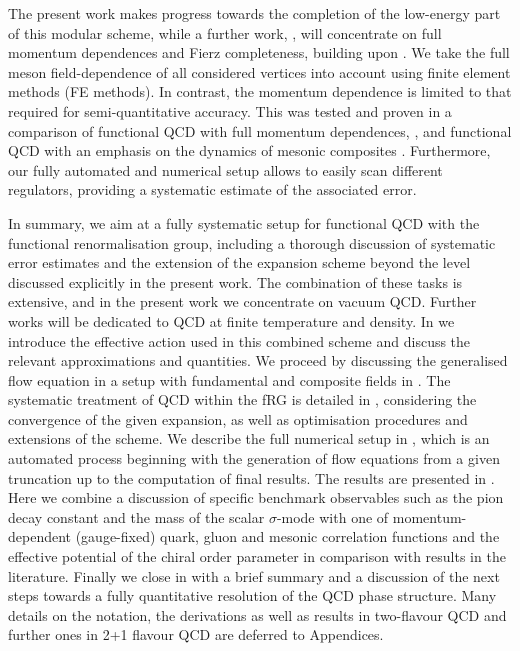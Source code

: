 \documentclass[aps,twocolumn,prd,superscriptaddress]{revtex4-2}
\begin{document}
The present work makes progress towards the completion of the low-energy part of this modular scheme, while a further work, \cite{FHPT2024}, will concentrate on full momentum dependences and Fierz completeness, building upon \cite{Mitter:2014wpa, Cyrol:2016tym, Cyrol:2017ewj, Fu:2022uow, Fu:2024ysj}. 
We take the full meson field-dependence of all considered vertices into account using finite element methods (FE methods). In contrast, the momentum dependence is limited to that required for semi-quantitative accuracy. This was tested and proven in a comparison of functional QCD with full momentum dependences, \cite{Pawlowski:2003hq, Fischer:2004uk, Mitter:2014wpa, Cyrol:2016tym, Cyrol:2017ewj, Cyrol:2017qkl, Corell:2018yil}, and functional QCD with an emphasis on the dynamics of mesonic composites \cite{Gies:2002hq, Braun:2008pi, Braun:2009gm, Braun:2014ata, Rennecke:2015eba, Fu:2019hdw, Braun:2020ada}. Furthermore, our fully automated and numerical setup allows to easily scan different regulators, providing a systematic estimate of the associated error. 

In summary, we aim at a fully systematic setup for functional QCD with the functional renormalisation group, including a thorough discussion of systematic error estimates and the extension of the expansion scheme beyond the level discussed explicitly in the present work. 
The combination of these tasks is extensive, and in the present work we concentrate on vacuum QCD. Further works will be dedicated to QCD at finite temperature and density. 
In  we introduce the effective action used in this combined scheme and discuss the relevant approximations and quantities. 
We proceed by discussing the generalised flow equation in a setup with fundamental and composite fields in .
The systematic treatment of QCD within the fRG is detailed in , considering the convergence of the given expansion, as well as optimisation procedures and extensions of the scheme. 
We describe the full numerical setup in , which is an automated process beginning with the generation of flow equations from a given truncation up to the computation of final results.
The results are presented in . Here we combine a discussion of specific benchmark observables such as the pion decay constant and the mass of the scalar $\sigma$-mode with one of momentum-dependent (gauge-fixed) quark, gluon and mesonic correlation functions and the effective potential of the chiral order parameter in comparison with results in the literature. Finally we close in  with a brief summary and a discussion of the next steps towards a fully quantitative resolution of the QCD phase structure. Many details on the notation, the derivations as well as results in two-flavour QCD and further ones in 2+1 flavour QCD are deferred to Appendices. 
\end{document}
